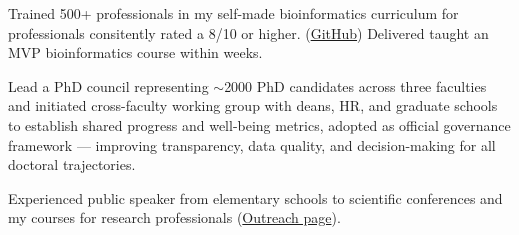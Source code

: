 \documentclass[a4paper,10pt]{article}
\begin{document}
{\begin{adjustbox}{valign=t}
\begin{minipage}[t]{0.6\textwidth}
\begin{description}
  \item Trained 500+ professionals in my self-made bioinformatics curriculum for professionals consitently rated a 8/10 or higher.
    (\href{https://github.com/lauralwd/professional_education}{GitHub})
  Delivered taught an MVP bioinformatics course within weeks. 
  \item Lead a PhD council representing $\sim$2000 PhD candidates across three faculties 
  and initiated cross-faculty working group with deans, HR, and graduate schools 
  to establish shared progress and well-being metrics, adopted as official governance framework 
  — improving transparency, data quality, and decision-making for all doctoral trajectories.
  \item Experienced public speaker from elementary schools to scientific conferences and my courses for research professionals
    (\href{https://lauralwd.github.io/outreach/}{Outreach page}).

\end{description}
\end{minipage}
\end{adjustbox}}
\end{document}

